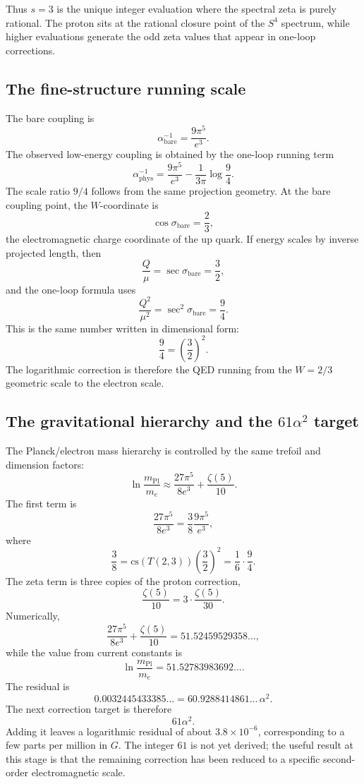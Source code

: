 Thus \(s=3\) is the unique integer evaluation where the spectral zeta is purely rational.  The proton sits at the rational closure point of the \(S^4\) spectrum, while higher evaluations generate the odd zeta values that appear in one-loop corrections.

\subsection{The fine-structure running scale}

The bare coupling is
\[
\alpha_{\mathrm{bare}}^{-1}
=
\frac{9\pi^5}{e^3}.
\]
The observed low-energy coupling is obtained by the one-loop running term
\[
\alpha_{\mathrm{phys}}^{-1}
=
\frac{9\pi^5}{e^3}
-
\frac{1}{3\pi}\log\frac94.
\]
The scale ratio \(9/4\) follows from the same projection geometry.  At the bare coupling point, the \(W\)-coordinate is
\[
\cos\sigma_{\mathrm{bare}}=\frac23,
\]
the electromagnetic charge coordinate of the up quark.  If energy scales by inverse projected length, then
\[
\frac{Q}{\mu}
=
\sec\sigma_{\mathrm{bare}}
=
\frac32,
\]
and the one-loop formula uses
\[
\frac{Q^2}{\mu^2}
=
\sec^2\sigma_{\mathrm{bare}}
=
\frac94.
\]
This is the same number written in dimensional form:
\[
\frac94=\left(\frac{3}{2}\right)^2.
\]
The logarithmic correction is therefore the QED running from the \(W=2/3\) geometric scale to the electron scale.

\subsection{The gravitational hierarchy and the \(61\alpha^2\) target}

The Planck/electron mass hierarchy is controlled by the same trefoil and dimension factors:
\[
\ln\frac{m_{\mathrm{Pl}}}{m_e}
\approx
\frac{27\pi^5}{8e^3}
+
\frac{\zeta(5)}{10}.
\]
The first term is
\[
\frac{27\pi^5}{8e^3}
=
\frac38\frac{9\pi^5}{e^3},
\]
where
\[
\frac38
=
\mathrm{cs}(T(2,3))\left(\frac32\right)^2
=
\frac16\cdot\frac94.
\]
The zeta term is three copies of the proton correction,
\[
\frac{\zeta(5)}{10}=3\cdot\frac{\zeta(5)}{30}.
\]
Numerically,
\[
\frac{27\pi^5}{8e^3}+\frac{\zeta(5)}{10}
=
51.52459529358\ldots,
\]
while the value from current constants is
\[
\ln\frac{m_{\mathrm{Pl}}}{m_e}
=
51.52783983692\ldots.
\]
The residual is
\[
0.0032445433385\ldots
=
60.9288414861\ldots\,\alpha^2.
\]
The next correction target is therefore
\[
61\alpha^2.
\]
Adding it leaves a logarithmic residual of about \(3.8\times10^{-6}\), corresponding to a few parts per million in \(G\).  The integer \(61\) is not yet derived; the useful result at this stage is that the remaining correction has been reduced to a specific second-order electromagnetic scale.

